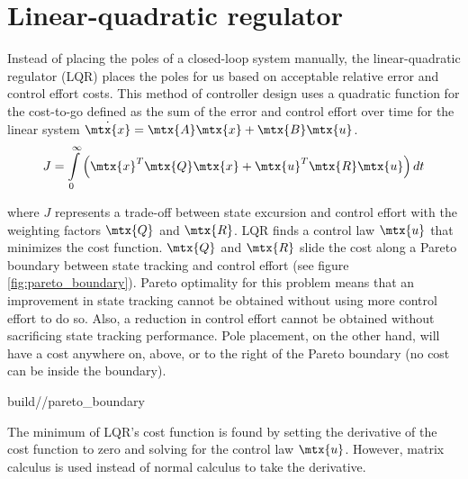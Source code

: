 \section{Linear-quadratic regulator} \label{sec:lqr}

Instead of placing the poles of a closed-loop \gls{system} manually, the
linear-quadratic regulator (LQR) places the poles for us based on acceptable
relative \gls{error} and \gls{control effort} costs. This method of controller
design uses a quadratic function for the cost-to-go defined as the sum of the
\gls{error} and \gls{control effort} over time for the linear \gls{system}
$\dot{\mtx{x}} = \mtx{A}\mtx{x} + \mtx{B}\mtx{u}$.
\begin{equation*}
  J = \int\limits_0^\infty \left(\mtx{x}^T\mtx{Q}\mtx{x} +
    \mtx{u}^T\mtx{R}\mtx{u}\right) dt
\end{equation*}

where $J$ represents a trade-off between \gls{state} excursion and
\gls{control effort} with the weighting factors $\mtx{Q}$ and $\mtx{R}$. LQR
finds a \gls{control law} $\mtx{u}$ that minimizes the cost function. $\mtx{Q}$
and $\mtx{R}$ slide the cost along a Pareto boundary between state tracking and
\gls{control effort} (see figure \ref{fig:pareto_boundary}). Pareto optimality
for this problem means that an improvement in state \gls{tracking} cannot be
obtained without using more \gls{control effort} to do so. Also, a reduction in
\gls{control effort} cannot be obtained without sacrificing state \gls{tracking}
performance. Pole placement, on the other hand, will have a cost anywhere on,
above, or to the right of the Pareto boundary (no cost can be inside the
boundary).
\begin{svg}{build/\chapterpath/pareto_boundary}
  \caption{Pareto boundary for LQR}
  \label{fig:pareto_boundary}
\end{svg}

The minimum of LQR's cost function is found by setting the derivative of the
cost function to zero and solving for the \gls{control law} $\mtx{u}$. However,
matrix calculus is used instead of normal calculus to take the derivative.

